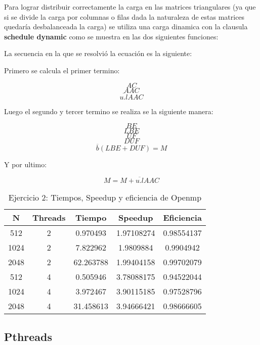 Para lograr distribuir correctamente la carga en las matrices triangulares (ya que si se divide la carga por columnas o filas dada la naturaleza de estas matrices quedaría desbalanceada la carga) se utiliza una carga dinamica con la clausula \textbf{schedule dynamic} como se muestra en las dos siguientes funciones:


La secuencia en la que se resolvió la ecuación es la siguiente:

Primero se calcula el primer termino:

$$ AC $$
$$ AAC $$
$$ \overline{u.l}AAC $$

Luego el segundo y tercer termino se realiza se la siguiente manera:

$$ BE $$
$$ LBE $$
$$ UF $$
$$ DUF $$
$$\overline{b}(LBE + DUF) = M$$

Y por ultimo:

$$ M = M + \overline{u.l}AAC $$

\begin{table}[htbp]
\centering
\caption{Ejercicio 2: Tiempos, Speedup y eficiencia de Openmp}
\begin{tabular}{|c|c|c|c|c|}
\hline
\textbf{N} & \textbf{Threads} & \textbf{Tiempo} & \textbf{Speedup} & \textbf{Eficiencia} \\ \hline
512        & 2                & 0.970493        & 1.97108274       & 0.98554137          \\ \hline
1024       & 2                & 7.822962        & 1.9809884        & 0.9904942           \\ \hline
2048       & 2                & 62.263788       & 1.99404158       & 0.99702079          \\ \hline
512        & 4                & 0.505946        & 3.78088175       & 0.94522044          \\ \hline
1024       & 4                & 3.972467        & 3.90115185       & 0.97528796          \\ \hline
2048       & 4                & 31.458613       & 3.94666421       & 0.98666605          \\ \hline
\end{tabular}
\end{table}

\subsection{Pthreads}

